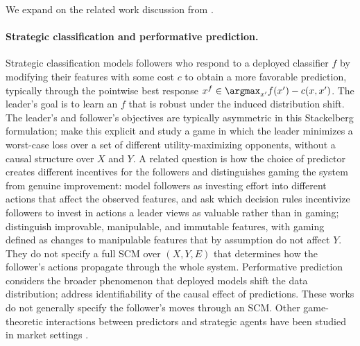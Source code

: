  \label{app:extended_related_works}




We expand on the related work discussion from .
 
\paragraph{Strategic classification and performative prediction.}
Strategic classification \citep{brucknerStackelbergGamesAdversarial2011, hardtStrategicClassification2016} models followers who respond to a deployed classifier $f$ by modifying their features with some cost $c$ to obtain a more favorable prediction, typically through the pointwise best response $x^f \in \argmax_{x'} f(x') - c(x, x')$. The leader's goal is to learn an $f$ that is robust under the induced distribution shift. The leader's and follower's objectives are typically asymmetric in this Stackelberg formulation; \citet{ehrenbergAdversariesIncentivesStrategic2024} make this explicit and study a game in which the leader minimizes a worst-case loss over a set of different utility-maximizing opponents, without a causal structure over $X$ and $Y$. A related question is how the choice of predictor creates different incentives for the followers and distinguishes gaming the system 
from genuine improvement:
\citet{kleinbergHowClassifiersInduce2019} model followers as investing effort into different actions that affect the observed features, and ask which decision rules incentivize followers to invest in actions a leader views as valuable rather than in gaming; \citet{chenLinearClassifiersThat2021} distinguish improvable, manipulable, and immutable features, with gaming defined as changes to manipulable features that by assumption do not affect $Y$. They do not specify a full SCM over $(X, Y, E)$ that determines how the follower's actions propagate through the whole system. Performative prediction \citep{perdomo2020performative, hardtPerformativePredictionFuture2025} considers the broader phenomenon that deployed models shift the data distribution; \citet{mendler-dunnerAnticipatingPerformativityPredicting2022} address identifiability of the causal effect of predictions. These works do not generally specify the follower's moves through an SCM.
Other game-theoretic interactions between predictors and strategic agents have been studied in market settings \citep{huIncentivizingHighQualityContent2023}.



